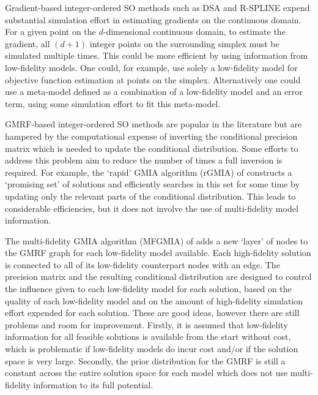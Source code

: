 \documentclass[12pt,a4paper]{article}
\begin{document}
Gradient-based integer-ordered SO methods such as DSA and R-SPLINE expend substantial simulation effort in estimating gradients on the continuous domain. For a given point on the $d$-dimensional continuous domain, to estimate the gradient, all $(d+1)$ integer points on the surrounding simplex must be simulated multiple times. This could be more efficient by using information from low-fidelity models. One could, for example, use solely a low-fidelity model for objective function estimation at points on the simplex. Alternatively one could use a meta-model defined as a combination of a low-fidelity model and an error term, using some simulation effort to fit this meta-model.

GMRF-based integer-ordered SO methods are popular in the literature but are hampered by the computational expense of inverting the conditional precision matrix which is needed to update the conditional distribution. Some efforts to address this problem aim to reduce the number of times a full inversion is required. For example, the `rapid' GMIA algorithm (rGMIA) of \citep{semelhago2021rapid} constructs a `promising set' of solutions and efficiently searches in this set for some time by updating only the relevant parts of the conditional distribution. This leads to considerable efficiencies, but it does not involve the use of multi-fidelity model information.

The multi-fidelity GMIA algorithm (MFGMIA) of \citep{li2022multi} adds a new `layer' of nodes to the GMRF graph for each low-fidelity model available. Each high-fidelity solution is connected to all of its low-fidelity counterpart nodes with an edge. The precision matrix and the resulting conditional distribution are designed to control the influence given to each low-fidelity model for each solution, based on the quality of each low-fidelity model and on the amount of high-fidelity simulation effort expended for each solution. These are good ideas, however there are still problems and room for improvement. Firstly, it is assumed that low-fidelity information for all feasible solutions is available from the start without cost, which is problematic if low-fidelity models do incur cost and/or if the solution space is very large. Secondly, the prior distribution for the GMRF is still a constant across the entire solution space for each model which does not use multi-fidelity information to its full potential.
\end{document}
